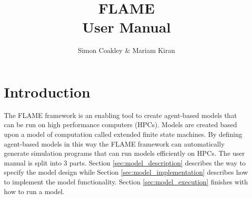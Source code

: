 \documentclass[12pt,a4paper]{article}
\begin{document}
\title{FLAME
\\User Manual}
\author{Simon Coakley \& Mariam Kiran}

\maketitle


\section{Introduction}

The FLAME framework is an enabling tool to create agent-based models that can
be run on high performance computers (HPCs). Models are created based upon a
model of computation called extended finite state machines. By defining
agent-based models in this way the FLAME framework can
automatically generate simulation programs that can run models efficiently on
HPCs.
The user manual is split into 3 parts. Section \ref{sec:model_description}
describes the way to specify the model design while Section
\ref{sec:model_implementation} describes how to implement the model
functionality. Section \ref{sec:model_execution} finishes with how to run a
model.

%








%
%
\end{document}

